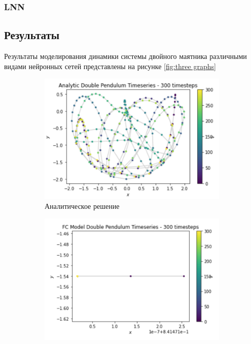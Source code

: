 \documentclass[12pt]{article}
\begin{document}
	\subsubsection{LNN}
	
	\subsection{Результаты}
	Результаты моделирования динамики системы двойного маятника различными видами нейронных сетей представлены на рисунке \ref{fig:three graphs}
	
	\begin{figure}[H]
		\centering
		\begin{subfigure}[b]{0.49\textwidth}
			\centering
			\includegraphics[width=\textwidth]{analytical_pendulum.png}
			\caption{Аналитическое решение}
			\label{fig:y equals x}
		\end{subfigure}
		\hfill
		\begin{subfigure}[b]{0.49\textwidth}
			\centering
			\includegraphics[width=\textwidth]{fc_pendulum.png}

\end{subfigure}
\end{figure}
\end{document}
